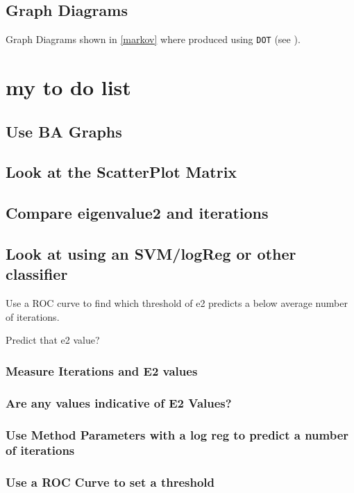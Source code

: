 \documentclass[11pt]{article}
\begin{document}
\subsection{Graph Diagrams}
\label{sec:org4f6a3f2}
Graph Diagrams shown in \ref{markov} where produced using \texttt{DOT} (see \cite{DOTLanguage,DOTGraphDescription2020}).
\section{my to do list}
\label{sec:orgf6609ce}
\subsection{Use BA Graphs}
\label{sec:orgeb75e47}
\subsection{Look at the ScatterPlot Matrix}
\label{sec:orgb1324a4}
\subsection{Compare eigenvalue2 and iterations}
\label{sec:org5e4ce24}

\subsection{Look at using an SVM/logReg or other classifier}
\label{sec:org2dc2d97}
Use a ROC curve to find which threshold of e2 predicts a below average number of iterations.

Predict that e2 value?
\subsubsection{Measure Iterations and E2 values}
\label{sec:org279da08}
\subsubsection{Are any values indicative of E2 Values?}
\label{sec:org5fc71e7}
\subsubsection{Use Method Parameters with a log reg to predict a number of iterations}
\label{sec:org7049260}
\subsubsection{Use a ROC Curve to set a threshold}
\label{sec:orge3171c1}
\end{document}
